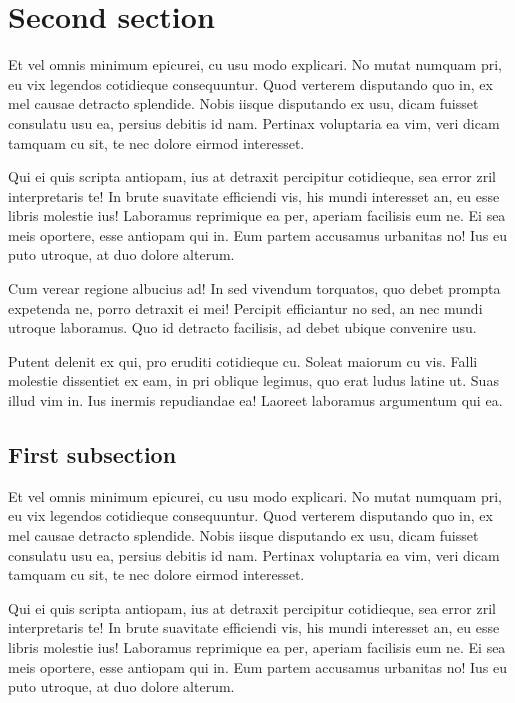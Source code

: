 \section{Second section}

Et vel omnis minimum epicurei, cu usu modo explicari. No mutat numquam pri, eu
vix legendos cotidieque consequuntur. Quod verterem disputando quo in, ex mel
causae detracto splendide. Nobis iisque disputando ex usu, dicam fuisset
consulatu usu ea, persius debitis id nam. Pertinax voluptaria ea vim, veri dicam
tamquam cu sit, te nec dolore eirmod interesset.

Qui ei quis scripta antiopam, ius at detraxit percipitur cotidieque, sea error
zril interpretaris te! In brute suavitate efficiendi vis, his mundi interesset
an, eu esse libris molestie ius! Laboramus reprimique ea per, aperiam facilisis
eum ne. Ei sea meis oportere, esse antiopam qui in. Eum partem accusamus
urbanitas no! Ius eu puto utroque, at duo dolore alterum.

Cum verear regione albucius ad! In sed vivendum torquatos, quo debet prompta
expetenda ne, porro detraxit ei mei! Percipit efficiantur no sed, an nec mundi
utroque laboramus. Quo id detracto facilisis, ad debet ubique convenire usu.

Putent delenit ex qui, pro eruditi cotidieque cu. Soleat maiorum cu vis. Falli
molestie dissentiet ex eam, in pri oblique legimus, quo erat ludus latine ut.
Suas illud vim in. Ius inermis repudiandae ea! Laoreet laboramus argumentum qui
ea.

\subsection{First subsection}

Et vel omnis minimum epicurei, cu usu modo explicari. No mutat numquam pri, eu
vix legendos cotidieque consequuntur. Quod verterem disputando quo in, ex mel
causae detracto splendide. Nobis iisque disputando ex usu, dicam fuisset
consulatu usu ea, persius debitis id nam. Pertinax voluptaria ea vim, veri dicam
tamquam cu sit, te nec dolore eirmod interesset.

Qui ei quis scripta antiopam, ius at detraxit percipitur cotidieque, sea error
zril interpretaris te! In brute suavitate efficiendi vis, his mundi interesset
an, eu esse libris molestie ius! Laboramus reprimique ea per, aperiam facilisis
eum ne. Ei sea meis oportere, esse antiopam qui in. Eum partem accusamus
urbanitas no! Ius eu puto utroque, at duo dolore alterum.

